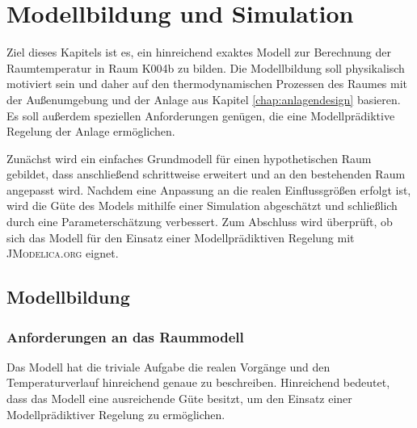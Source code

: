 %
%

\renewcommand{\chapterheadstartvskip}{\vspace*{2cm}}

\chapter{Modellbildung und Simulation}
\label{chap:modellbildung}

Ziel dieses Kapitels ist es, ein hinreichend exaktes Modell zur Berechnung der Raumtemperatur in  Raum K004b zu bilden. Die Modellbildung soll physikalisch motiviert sein und daher auf den thermodynamischen Prozessen des Raumes mit der Außenumgebung und der Anlage aus Kapitel \ref{chap:anlagendesign} basieren. Es soll außerdem speziellen Anforderungen genügen, die eine Modellprädiktive Regelung der Anlage ermöglichen.

Zunächst wird ein einfaches Grundmodell für einen hypothetischen Raum gebildet, dass anschließend schrittweise erweitert und an den bestehenden Raum angepasst wird. Nachdem eine Anpassung an die realen Einflussgrößen erfolgt ist, wird die Güte des Models mithilfe einer Simulation abgeschätzt und schließlich durch eine Parameterschätzung verbessert. Zum Abschluss wird überprüft, ob sich das Modell für den Einsatz einer Modellprädiktiven Regelung mit \textsc{JModelica.org} eignet.


\section{Modellbildung}

\subsection{Anforderungen an das Raummodell}

Das Modell hat die triviale Aufgabe die realen Vorgänge und den Temperaturverlauf hinreichend genaue zu beschreiben. Hinreichend bedeutet, dass das Modell eine ausreichende Güte besitzt, um den Einsatz einer Modellprädiktiver Regelung zu ermöglichen. 

